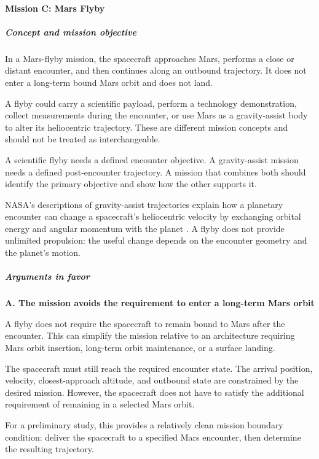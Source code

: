 \paragraph{Mission C: Mars Flyby}

\subparagraph{Concept and mission objective}

In a Mars-flyby mission, the spacecraft approaches Mars, performs
a close or distant encounter, and then continues along an
outbound trajectory. It does not enter a long-term bound Mars
orbit and does not land.

A flyby could carry a scientific payload, perform a technology
demonstration, collect measurements during the encounter, or
use Mars as a gravity-assist body to alter its heliocentric
trajectory. These are different mission concepts and should
not be treated as interchangeable.

A scientific flyby needs a defined encounter objective. A
gravity-assist mission needs a defined post-encounter trajectory.
A mission that combines both should identify the primary
objective and show how the other supports it.

NASA's descriptions of gravity-assist trajectories explain how
a planetary encounter can change a spacecraft's heliocentric
velocity by exchanging orbital energy and angular momentum
with the planet \cite{NASATrajectories}. A flyby does not
provide unlimited propulsion: the useful change depends on
the encounter geometry and the planet's motion.

\subparagraph{Arguments in favor}

\textbf{A. The mission avoids the requirement to enter
	a long-term Mars orbit}

A flyby does not require the spacecraft to remain bound to
Mars after the encounter. This can simplify the mission
relative to an architecture requiring Mars orbit insertion,
long-term orbit maintenance, or a surface landing.

The spacecraft must still reach the required encounter state.
The arrival position, velocity, closest-approach altitude,
and outbound state are constrained by the desired mission.
However, the spacecraft does not have to satisfy the additional
requirement of remaining in a selected Mars orbit.

For a preliminary study, this provides a relatively clean
mission boundary condition: deliver the spacecraft to a
specified Mars encounter, then determine the resulting trajectory.

